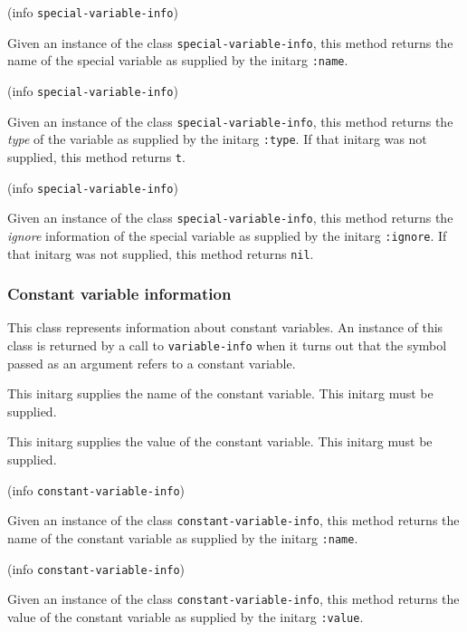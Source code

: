  {(info {\tt special-variable-info})}

Given an instance of the class \texttt{special-variable-info}, this
method returns the name of the special variable as supplied by the
initarg \texttt{:name}.

 {(info {\tt special-variable-info})}

Given an instance of the class \texttt{special-variable-info}, this
method returns the \emph{type} of the variable as supplied by the
initarg \texttt{:type}.  If that initarg was not supplied, this method
returns \texttt{t}.

 {(info {\tt special-variable-info})}

Given an instance of the class \texttt{special-variable-info}, this
method returns the \emph{ignore} information of the special variable as
supplied by the initarg \texttt{:ignore}.  If that initarg was not
supplied, this method returns \texttt{nil}.

\subsubsection{Constant variable information}


This class represents information about constant variables.   An
instance of this class is returned by a call to \texttt{variable-info}
when it turns out that the symbol passed as an argument refers to a
constant variable.


This initarg supplies the name of the constant variable.  This initarg
must be supplied. 


This initarg supplies the value of the constant variable.  This
initarg must be supplied.

 {(info {\tt constant-variable-info})}

Given an instance of the class \texttt{constant-variable-info}, this
method returns the name of the constant variable as supplied by the
initarg \texttt{:name}.

 {(info {\tt constant-variable-info})}

Given an instance of the class \texttt{constant-variable-info}, this
method returns the value of the constant variable as supplied by the
initarg \texttt{:value}.

